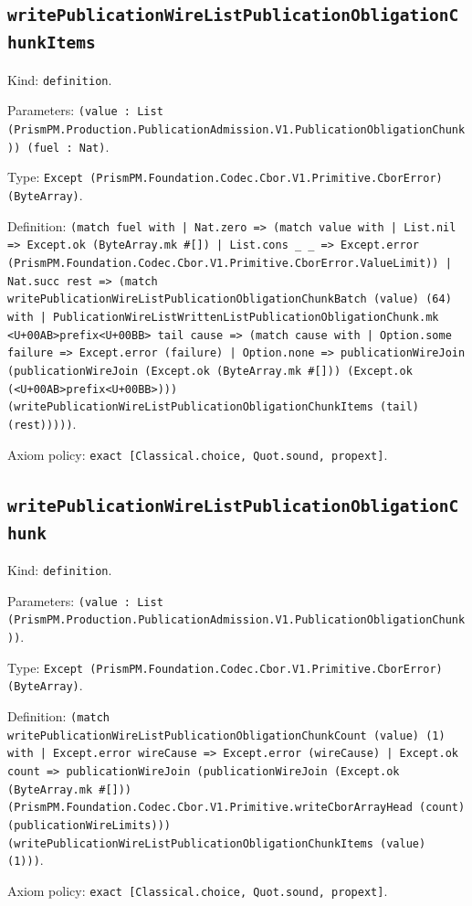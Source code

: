 \documentclass[11pt]{article}
\begin{document}
\subsection*{\texttt{writePublicationWireListPublicationObligationChunkItems}}
\noindent Kind: \texttt{definition}.\par
\noindent Parameters: \texttt{(value : List (PrismPM.Production.PublicationAdmission.V1.PublicationObligationChunk)) (fuel : Nat)}.\par
\noindent Type: \texttt{Except (PrismPM.Foundation.Codec.Cbor.V1.Primitive.CborError) (ByteArray)}.\par
\noindent Definition: \texttt{(match fuel with | Nat.zero => (match value with | List.nil => Except.ok (ByteArray.mk \#[]) | List.cons \_ \_ => Except.error (PrismPM.Foundation.Codec.Cbor.V1.Primitive.CborError.ValueLimit)) | Nat.succ rest => (match writePublicationWireListPublicationObligationChunkBatch (value) (64) with | PublicationWireListWrittenListPublicationObligationChunk.mk <U+00AB>prefix<U+00BB> tail cause => (match cause with | Option.some failure => Except.error (failure) | Option.none => publicationWireJoin (publicationWireJoin (Except.ok (ByteArray.mk \#[])) (Except.ok (<U+00AB>prefix<U+00BB>))) (writePublicationWireListPublicationObligationChunkItems (tail) (rest)))))}.\par
\noindent Axiom policy: \texttt{exact [Classical.choice, Quot.sound, propext]}.\par
\subsection*{\texttt{writePublicationWireListPublicationObligationChunk}}
\noindent Kind: \texttt{definition}.\par
\noindent Parameters: \texttt{(value : List (PrismPM.Production.PublicationAdmission.V1.PublicationObligationChunk))}.\par
\noindent Type: \texttt{Except (PrismPM.Foundation.Codec.Cbor.V1.Primitive.CborError) (ByteArray)}.\par
\noindent Definition: \texttt{(match writePublicationWireListPublicationObligationChunkCount (value) (1) with | Except.error wireCause => Except.error (wireCause) | Except.ok count => publicationWireJoin (publicationWireJoin (Except.ok (ByteArray.mk \#[])) (PrismPM.Foundation.Codec.Cbor.V1.Primitive.writeCborArrayHead (count) (publicationWireLimits))) (writePublicationWireListPublicationObligationChunkItems (value) (1)))}.\par
\noindent Axiom policy: \texttt{exact [Classical.choice, Quot.sound, propext]}.\par
\end{document}
